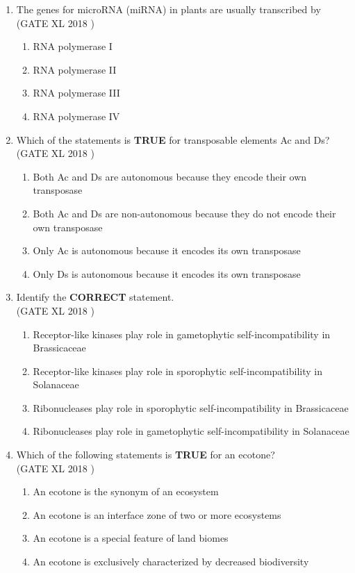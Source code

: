 \documentclass[14pt]{extarticle}
\begin{document}
\begin{flushleft}
\begin{enumerate}[leftmargin=*]
    \item The genes for microRNA (miRNA) in plants are usually transcribed by\\
    \hfill(GATE XL 2018 )
    \begin{multicols}{2}
    \begin{enumerate}
        \item RNA polymerase I
        \item RNA polymerase II
        \item RNA polymerase III
        \item RNA polymerase IV
    \end{enumerate}
    \end{multicols}

    \item Which of the statements is \textbf{TRUE} for transposable elements Ac and Ds?\\
  \hfill(GATE XL 2018 ) 
    \begin{enumerate}
        \item Both Ac and Ds are autonomous because they encode their own transposase
        \item Both Ac and Ds are non-autonomous because they do not encode their own transposase
        \item Only Ac is autonomous because it encodes its own transposase
        \item Only Ds is autonomous because it encodes its own transposase
    \end{enumerate}
    

    \item Identify the \textbf{CORRECT} statement.\\
   \hfill(GATE XL 2018 )
    \begin{enumerate}
        \item Receptor-like kinases play role in gametophytic self-incompatibility in Brassicaceae
        \item Receptor-like kinases play role in sporophytic self-incompatibility in Solanaceae
        \item Ribonucleases play role in sporophytic self-incompatibility in Brassicaceae
        \item Ribonucleases play role in gametophytic self-incompatibility in Solanaceae
    \end{enumerate}
    

    \item Which of the following statements is \textbf{TRUE} for an ecotone?\\
   \hfill(GATE XL 2018 )
    \begin{enumerate}
        \item An ecotone is the synonym of an ecosystem
        \item An ecotone is an interface zone of two or more ecosystems
        \item An ecotone is a special feature of land biomes
        \item An ecotone is exclusively characterized by decreased biodiversity
    \end{enumerate}
    


\end{enumerate}
\end{flushleft}
\end{document}
